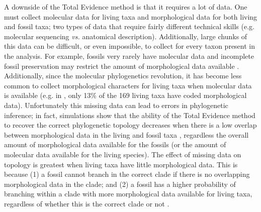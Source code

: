 \documentclass[12pt,letterpaper]{article}
\begin{document}
A downside of the Total Evidence method is that it requires a lot of data.
One must collect molecular data for living taxa and morphological data for both living and fossil taxa; two types of data that require fairly different technical skills (e.g. molecular sequencing \textit{vs.} anatomical description).
Additionally, large chunks of this data can be difficult, or even impossible, to collect for every taxon present in the analysis.
For example, fossils very rarely have molecular data and incomplete fossil preservation may restrict the amount of morphological data available \citep{sansomfossilization2013}. %
Additionally, since the molecular phylogenetics revolution, it has become less common to collect morphological characters for living taxa when molecular data is available (e.g. in \cite{slaterphylogenetic2013}, only 13\% of the 169 living taxa have coded morphological data).
Unfortunately this missing data can lead to errors in phylogenetic inference; in fact, simulations show that the ability of the Total Evidence method to recover the correct phylogenetic topology decreases when there is a low overlap between morphological data in the living and fossil taxa \citep{GuillermeCooper}, regardless the overall amount of morphological data available for the fossils (or the amount of molecular data available for the living species).
The effect of missing data on topology is greatest when living taxa have little morphological data.
This is because (1) a fossil cannot branch in the correct clade if there is no overlapping morphological data in the clade; and (2) a fossil has a higher probability of branching within a clade with more morphological data available for living taxa, regardless of whether this is the correct clade or not \citep{GuillermeCooper}. 
\end{document}
